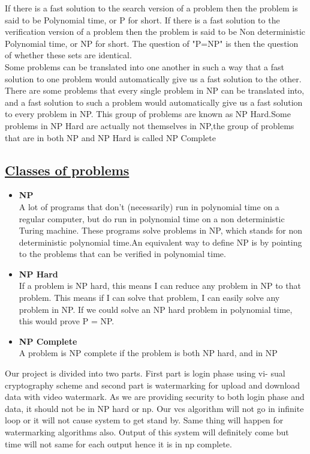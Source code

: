 \hspace{1em}If there is a fast solution to the search version of a problem then the problem is
said to be Polynomial time,
or P for short. If there is a fast solution to the verification version of a problem then the problem is said to be
Non deterministic Polynomial time,
or NP for short. The question of
"P=NP" is then the question of whether these sets are identical.\\

\hspace{1em}Some problems can be translated into one another in such a way that a fast
solution to one problem would automatically give us a fast solution to the
other. There are some problems that every single problem in NP can be
translated into, and a fast solution to such a problem would automatically give
us a fast solution to every problem in NP. This group of problems are known as
NP Hard.Some problems in NP Hard
are actually not themselves in NP,the
group of problems that are in both NP and NP Hard
is called NP Complete

\subsection*{\underline{Classes of problems}}
\begin{itemize}
\item \textbf{NP}\\
A lot of programs that don't (necessarily) run in polynomial time
on a regular computer, but do run in polynomial time on a non deterministic
Turing machine. These programs solve problems in NP, which stands for
non deterministic polynomial time.An equivalent way to define NP is by pointing to the problems that can be
verified in polynomial time.

\item \textbf{NP Hard}\\
If a problem is NP hard,
this means I can reduce any problem in NP to that problem. This means if I can solve that problem, I can easily solve any problem in NP. If we could solve an NP hard
problem in polynomial time, this would
prove P = NP.

\item \textbf{NP Complete}\\
A problem is NP complete
if the problem is both
NP hard, and in NP
\end{itemize}
\noindent
\hspace{5em}Our project  is  divided  into  two  parts.   First  part  is  login  phase  using  vi- sual cryptography scheme and second part is watermarking for upload and download data with video watermark.  As we are providing security to both login phase and data, it should not be in NP hard or np.  Our vcs algorithm will not go in infinite loop or it will not cause system to get stand by.
Same thing will happen for watermarking algorithms also.  Output of this
system will definitely come but time will not same for each output hence it is in np complete.

